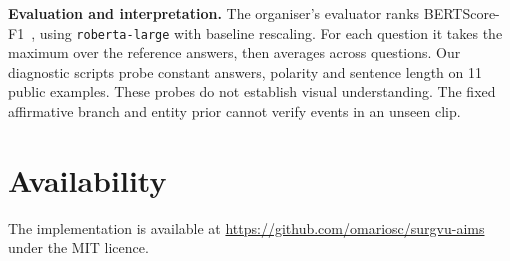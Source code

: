 \documentclass[10pt,a4paper]{article}
\begin{document}
\textbf{Evaluation and interpretation.}
The organiser's evaluator ranks BERTScore-F1~\cite{bertscore}, using \texttt{roberta-large}
with baseline rescaling. For each question it takes the maximum over the reference answers, then
averages across questions. Our diagnostic scripts probe constant answers, polarity and sentence length on 11 public examples.
These probes do not establish visual understanding. The fixed affirmative branch and entity prior
cannot verify events in an unseen clip.

\section{Availability}
The implementation is available at \url{https://github.com/omariosc/surgvu-aims}
under the MIT licence.

{\small


}
\end{document}
